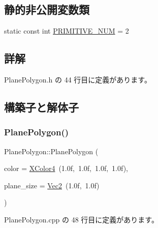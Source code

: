\subsection*{静的非公開変数類}
\begin{DoxyCompactItemize}
\item 
static const int \mbox{\hyperlink{class_plane_polygon_ad79c2128868044fb495b70ee08c65e8c}{P\+R\+I\+M\+I\+T\+I\+V\+E\+\_\+\+N\+UM}} = 2
\end{DoxyCompactItemize}


\subsection{詳解}


 Plane\+Polygon.\+h の 44 行目に定義があります。



\subsection{構築子と解体子}
\mbox{\label{class_plane_polygon_a27987c23a242840b142e0fa11650daf6}} 
\subsubsection{\texorpdfstring{Plane\+Polygon()}{PlanePolygon()}}
{\footnotesize\ttfamily Plane\+Polygon\+::\+Plane\+Polygon (\begin{DoxyParamCaption}\item[{\mbox{\hyperlink{_vector3_d_8h_a680c30c4a07d86fe763c7e01169cd6cc}{X\+Color4}}}]{color = {\ttfamily \mbox{\hyperlink{_vector3_d_8h_a680c30c4a07d86fe763c7e01169cd6cc}{X\+Color4}}~(1.0f,~1.0f,~1.0f,~1.0f)},  }\item[{\mbox{\hyperlink{_vector3_d_8h_a5ef6e95dfc5f9d3820b71772d99bbc25}{Vec2}}}]{plane\+\_\+size = {\ttfamily \mbox{\hyperlink{_vector3_d_8h_a5ef6e95dfc5f9d3820b71772d99bbc25}{Vec2}}~(1.0f,~1.0f)} }\end{DoxyParamCaption})}



 Plane\+Polygon.\+cpp の 48 行目に定義があります。

\mbox{\label{class_plane_polygon_ac91d7ac1ceb00239f54b543690a78dab}} 

